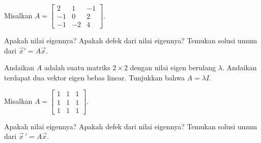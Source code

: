 \begin{exercise}
Misalkan
$A = \left[ \begin{smallmatrix}
2 & 1 & -1 \\
-1 & 0 & 2 \\
-1 & -2 & 4
\end{smallmatrix} \right]$.
\begin{tasks}
\task Apakah nilai eigennya?
\task Apakah defek dari nilai eigennya?
\task Temukan solusi umum dari ${\vec{x}}' = A \vec{x}$.
\end{tasks}
\end{exercise}

\begin{exercise}
Andaikan $A$ adalah suatu matriks $2 \times 2$ dengan nilai eigen berulang
$\lambda$.
Andaikan terdapat dua vektor eigen bebas linear.  Tunjukkan bahwa
$A = \lambda I$.
\end{exercise}

\setcounter{exercise}{100}

\begin{exercise}
Misalkan $A =
\left[ \begin{smallmatrix}
1 & 1 & 1 \\
1 & 1 & 1 \\
1 & 1 & 1 
\end{smallmatrix}\right]$.  
\begin{tasks}
\task Apakah nilai eigennya?
\task Apakah defek dari nilai eigennya?
\task Temukan solusi umum dari $\vec{x}\,' = A\vec{x}$.
\end{tasks}
\end{exercise}

